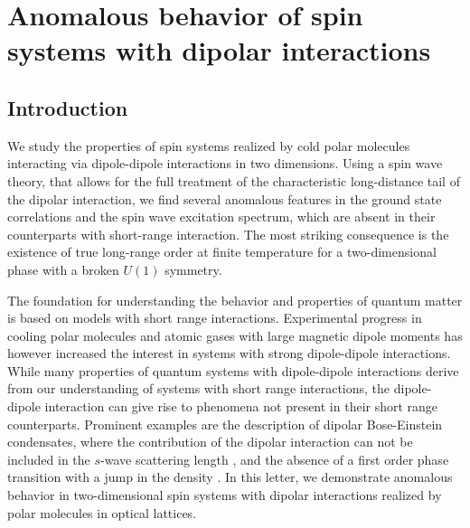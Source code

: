 
\chapter{Anomalous behavior of spin systems with dipolar interactions}
\label{anomalous_behavior}

\section{Introduction}
 We study the properties of spin systems realized by cold polar molecules interacting via dipole-dipole interactions in two dimensions.
 Using a spin wave theory, that allows for the full treatment of the characteristic long-distance tail of the dipolar interaction, we find several
 anomalous features in the ground state correlations and the spin wave excitation spectrum, which are absent in their counterparts with short-range interaction. The most striking consequence is
 the existence of true long-range order at finite temperature for a two-dimensional phase with a broken $U(1)$ symmetry.

The foundation for understanding the behavior and properties of quantum matter
is based on models with short range interactions. Experimental progress
in cooling polar molecules \cite{Ni2008b} and atomic gases with large magnetic dipole moments \cite{Griesmaier2005a}
has however increased the interest in systems with strong dipole-dipole interactions. While many
properties of quantum systems with dipole-dipole interactions derive from our understanding
of systems with short range interactions, the dipole-dipole interaction can give rise to phenomena
not present in their short range counterparts. Prominent examples are the description of dipolar
Bose-Einstein condensates, where the contribution of the dipolar interaction can not be included
in the $s$-wave scattering length \cite{Lahaye2009}, and the absence of a first order phase transition with a jump in the density \cite{Spivak2004}.
In this letter, we demonstrate anomalous behavior in two-dimensional spin systems with dipolar interactions
realized by polar molecules in optical lattices.

